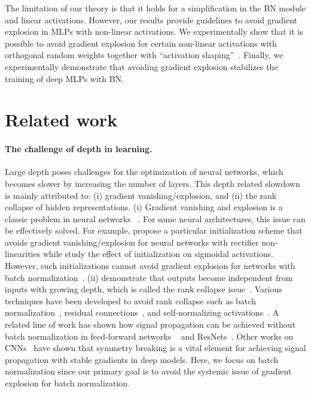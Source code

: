 The limitation of our theory is that it holds for a simplification in the BN module and linear activations. However, our results provide guidelines to avoid gradient explosion in MLPs with non-linear activations. We experimentally show that it is possible to avoid gradient explosion for certain non-linear activations with orthogonal random weights together with ``activation shaping''~\cite{martens2021rapid}. Finally, we experimentally demonstrate that avoiding gradient explosion stabilizes the training of deep MLPs with BN. 

\section{Related work}
\label{grad:sec:related_work}
\paragraph{The challenge of depth in learning.} Large depth poses challenges for the optimization of neural networks, which becomes slower by increasing the number of layers. This depth related slowdown is mainly attributed to: (i) gradient vanishing/explosion, and (ii) the rank collapse of hidden representations. (i) Gradient vanishing and explosion is a classic problem in neural networks ~\citep{hochreiter1998vanishing}. For some neural architectures, this issue can be effectively solved. For example, \citet{he2015delving} propose a particular initialization scheme that avoids gradient vanishing/explosion for neural networks with rectifier non-linearities while  \citet{glorot2010understanding} study the effect of initialization on sigmoidal activations. However, such initializations cannot avoid gradient explosion for networks with batch normalization~\citep{yang2018a,lubana2021beyond}. (ii) \citet{saxe2013exact} demonstrate that outputs become independent from inputs with growing depth, which is called the rank collapse issue~\citep{daneshmand2020batch,dong2021attention}. Various techniques have been developed to avoid rank collapse such as batch normalization~\cite{ioffe2015batch}, residual connections~\cite{he2016res}, and self-normalizing activations~\cite{klambauer2017self}. A related line of work has shown how signal propagation can be achieved without batch normalization in feed-forward networks ~\citep{burkholz2019initialization} and ResNets~\citep{brock2021characterizing}.
Other works on CNNs~\cite{blumenfeld2020beyond} have shown that symmetry breaking is a vital element for achieving signal propagation with stable gradients in deep models. 
Here, we focus on batch normalization since our primary goal is to avoid the systemic issue of gradient explosion for batch normalization.

